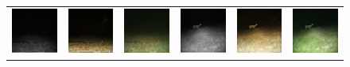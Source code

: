 \begin{figure}
\begin{tabularx}{\textwidth}{Y Y Y !{\space} Y Y Y}
        \includegraphics{gfx/conditional-diffusion-sampling-qual/nir_S2_B06_R3_PICT3848.jpg} & \includegraphics{gfx/conditional-diffusion-sampling-qual/cyclegan_S2_B06_R3_PICT3848_fake.png} & \includegraphics{gfx/conditional-diffusion-sampling-qual/diffusion_S2_B06_R3_PICT3848.png} & \includegraphics{gfx/conditional-diffusion-sampling-qual/nir_S2_B07_R1_PICT3274.jpg} & \includegraphics{gfx/conditional-diffusion-sampling-qual/cyclegan_S2_B07_R1_PICT3274_fake.png} & \includegraphics{gfx/conditional-diffusion-sampling-qual/diffusion_S2_B07_R1_PICT3274.png}
    \end{tabularx}
    \caption{
    }
    \label{fig:qualitative-evaluation-conditional-sampling}
\end{figure}

